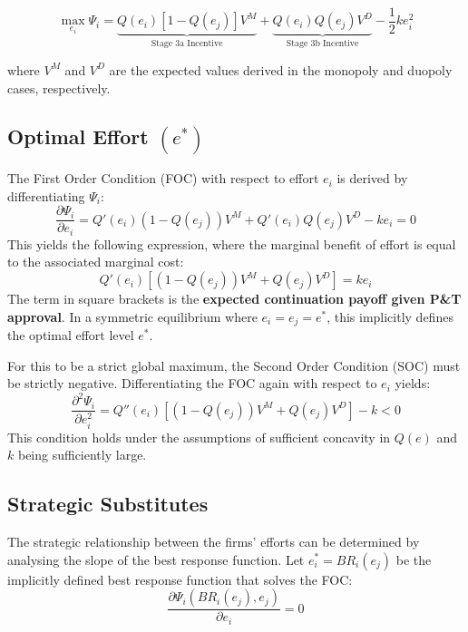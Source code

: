 \documentclass[12pt]{article}
\begin{document}
\begin{equation}
    \max_{e_i} \Psi_i = \underbrace{Q(e_i)[1-Q(e_j)] V^M}_{\text{Stage 3a Incentive}} + \underbrace{Q(e_i)Q(e_j) V^D}_{\text{Stage 3b Incentive}} - \frac{1}{2} k e_i^2
\end{equation}

where $V^M$ and $V^D$ are the expected values derived in the monopoly and duopoly cases, respectively.

\subsection{Optimal Effort \texorpdfstring{$(e^*)$}{(e*)}}
The First Order Condition (FOC) with respect to effort $e_i$ is derived by differentiating $\Psi_i$:
\begin{equation}
    \frac{\partial \Psi_i}{\partial e_i} = Q'(e_i)(1-Q(e_j)) V^M + Q'(e_i)Q(e_j) V^D - k e_i = 0
\end{equation}
This yields the following expression, where the marginal benefit of effort is equal to the associated marginal cost:
\begin{equation} \label{eq:FOC_final}
    Q'(e_i) \left[ (1-Q(e_j)) V^M + Q(e_j) V^D \right] = k e_i
\end{equation}
The term in square brackets is the \textbf{expected continuation payoff given P\&T approval}. In a symmetric equilibrium where $e_i = e_j = e^*$, this implicitly defines the optimal effort level $e^*$. 

For this to be a strict global maximum, the Second Order Condition (SOC) must be strictly negative. Differentiating the FOC again with respect to $e_i$ yields:
\begin{equation}
    \frac{\partial^2 \Psi_i}{\partial e_i^2} = Q''(e_i) \left[ (1-Q(e_j)) V^M + Q(e_j) V^D \right] - k < 0
\end{equation}
This condition holds under the assumptions of sufficient concavity in $Q(e)$ and $k$ being sufficiently large.

\subsection{Strategic Substitutes}
The strategic relationship between the firms' efforts can be determined by analysing the slope of the best response function. Let $e^*_i = BR_i(e_j)$ be the implicitly defined best response function that solves the FOC:
\begin{equation}
    \frac{\partial \Psi_i (BR_i(e_j), e_j)}{\partial e_i} = 0
\end{equation}
\end{document}
